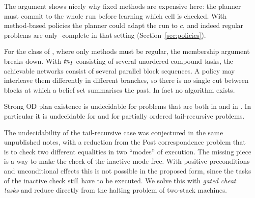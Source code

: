 The argument shows nicely why fixed methods are expensive here: the planner must commit to the
whole run before learning which cell is checked. With method-based policies the planner could
adapt the run to $c$, and indeed regular problems are only \EXPTIME-complete in that setting
(Section~\ref{sec:policies}).

For the class \REG{} of \textcite{bercher:et:al:ijcai-19}, where only methods must be regular, the
membership argument breaks down. With $\mathit{tn}_I$ consisting of several unordered compound tasks, the
achievable networks consist of several parallel block sequences. A policy may interleave them
differently in different branches, so there is no single cut between blocks at which a belief set
summarises the past. In fact no algorithm exists.

\begin{theorem}\label{thm:reg-undec}
  Strong OD plan existence is undecidable for problems that are both in \REG{} and in \TR{}. In
  particular it is undecidable for \REG{} and for partially ordered tail-recursive problems.
\end{theorem}

The undecidability of the tail-recursive case was conjectured in the same unpublished notes,
with a reduction from the Post correspondence problem that is to check two different equalities in
two ``modes'' of execution. The missing piece is a way to make the check of the inactive mode
free. With positive preconditions and unconditional effects this is not possible in the proposed
form, since the tasks of the inactive check still have to be executed. We solve this with
\emph{gated cheat tasks} and reduce directly from the halting problem of two-stack machines.

